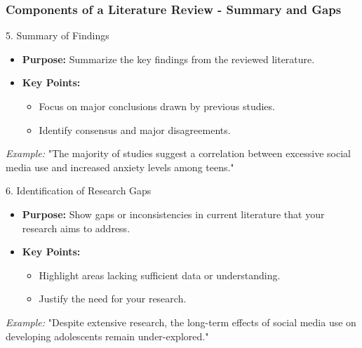 \documentclass[aspectratio=169]{beamer}
\begin{document}
\begin{frame}[fragile]
    \frametitle{Components of a Literature Review - Summary and Gaps}
    \begin{block}{5. Summary of Findings}
        \begin{itemize}
            \item \textbf{Purpose:} Summarize the key findings from the reviewed literature.
            \item \textbf{Key Points:}
                \begin{itemize}
                    \item Focus on major conclusions drawn by previous studies.
                    \item Identify consensus and major disagreements.
                \end{itemize}
        \end{itemize}
        \textit{Example:} "The majority of studies suggest a correlation between excessive social media use and increased anxiety levels among teens."
    \end{block}

    \begin{block}{6. Identification of Research Gaps}
        \begin{itemize}
            \item \textbf{Purpose:} Show gaps or inconsistencies in current literature that your research aims to address.
            \item \textbf{Key Points:}
                \begin{itemize}
                    \item Highlight areas lacking sufficient data or understanding.
                    \item Justify the need for your research.
                \end{itemize}
        \end{itemize}
        \textit{Example:} "Despite extensive research, the long-term effects of social media use on developing adolescents remain under-explored."
    \end{block}
\end{frame}
\end{document}
